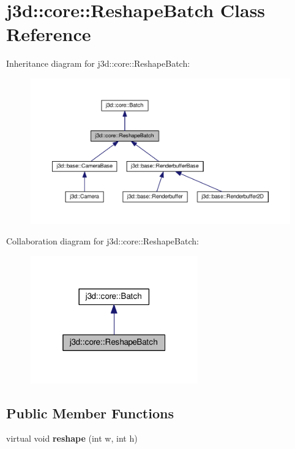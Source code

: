 \hypertarget{classj3d_1_1core_1_1ReshapeBatch}{}\section{j3d\+:\+:core\+:\+:Reshape\+Batch Class Reference}
\label{classj3d_1_1core_1_1ReshapeBatch}


Inheritance diagram for j3d\+:\+:core\+:\+:Reshape\+Batch\+:
\nopagebreak
\begin{figure}[H]
\begin{center}
\leavevmode
\includegraphics[width=350pt]{classj3d_1_1core_1_1ReshapeBatch__inherit__graph}
\end{center}
\end{figure}


Collaboration diagram for j3d\+:\+:core\+:\+:Reshape\+Batch\+:
\nopagebreak
\begin{figure}[H]
\begin{center}
\leavevmode
\includegraphics[width=205pt]{classj3d_1_1core_1_1ReshapeBatch__coll__graph}
\end{center}
\end{figure}
\subsection*{Public Member Functions}
\begin{DoxyCompactItemize}
\item 
\hypertarget{classj3d_1_1core_1_1ReshapeBatch_ac3bcf95cb9a212c831309666c7fe8474}{}virtual void {\bfseries reshape} (int w, int h)\label{classj3d_1_1core_1_1ReshapeBatch_ac3bcf95cb9a212c831309666c7fe8474}

\end{DoxyCompactItemize}
